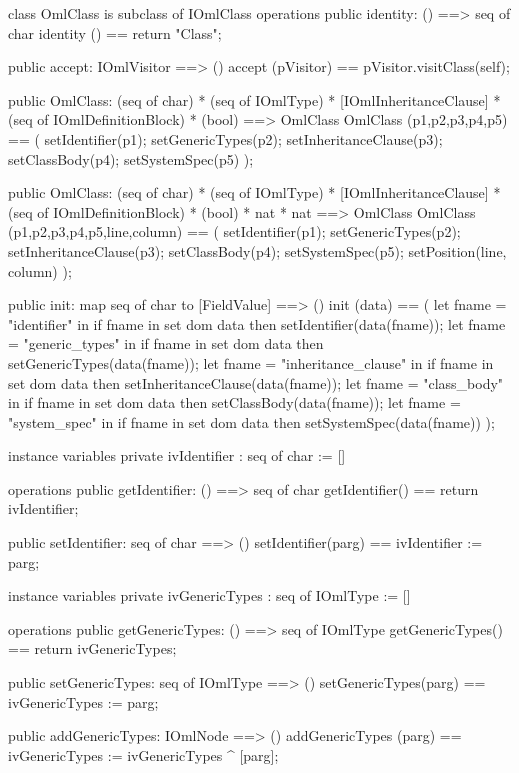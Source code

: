 \begin{vdm_al}
class OmlClass is subclass of IOmlClass
operations
  public identity: () ==> seq of char
  identity () == return "Class";

  public accept: IOmlVisitor ==> ()
  accept (pVisitor) == pVisitor.visitClass(self);

  public OmlClass:
    (seq of char) *
    (seq of IOmlType) *
    [IOmlInheritanceClause] *
    (seq of IOmlDefinitionBlock) *
    (bool) ==> OmlClass
  OmlClass (p1,p2,p3,p4,p5) == 
    ( setIdentifier(p1);
      setGenericTypes(p2);
      setInheritanceClause(p3);
      setClassBody(p4);
      setSystemSpec(p5) );

  public OmlClass:
    (seq of char) *
    (seq of IOmlType) *
    [IOmlInheritanceClause] *
    (seq of IOmlDefinitionBlock) *
    (bool) *
    nat *
    nat ==> OmlClass
  OmlClass (p1,p2,p3,p4,p5,line,column) == 
    ( setIdentifier(p1);
      setGenericTypes(p2);
      setInheritanceClause(p3);
      setClassBody(p4);
      setSystemSpec(p5);
      setPosition(line, column) );

  public init: map seq of char to [FieldValue] ==> ()
  init (data) ==
    ( let fname = "identifier" in
        if fname in set dom data
        then setIdentifier(data(fname));
      let fname = "generic_types" in
        if fname in set dom data
        then setGenericTypes(data(fname));
      let fname = "inheritance_clause" in
        if fname in set dom data
        then setInheritanceClause(data(fname));
      let fname = "class_body" in
        if fname in set dom data
        then setClassBody(data(fname));
      let fname = "system_spec" in
        if fname in set dom data
        then setSystemSpec(data(fname)) );

instance variables
  private ivIdentifier : seq of char := []

operations
  public getIdentifier: () ==> seq of char
  getIdentifier() == return ivIdentifier;

  public setIdentifier: seq of char ==> ()
  setIdentifier(parg) == ivIdentifier := parg;

instance variables
  private ivGenericTypes : seq of IOmlType := []

operations
  public getGenericTypes: () ==> seq of IOmlType
  getGenericTypes() == return ivGenericTypes;

  public setGenericTypes: seq of IOmlType ==> ()
  setGenericTypes(parg) == ivGenericTypes := parg;

  public addGenericTypes: IOmlNode ==> ()
  addGenericTypes (parg) == ivGenericTypes := ivGenericTypes ^ [parg];


\end{vdm_al}
